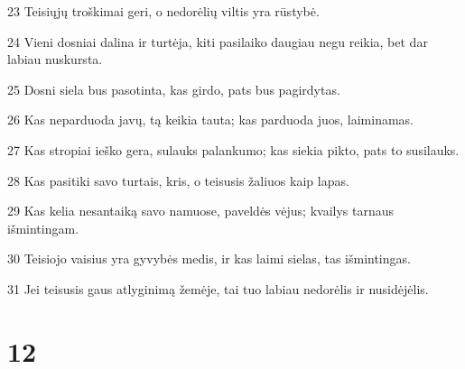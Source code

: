 \par 23 Teisiųjų troškimai geri, o nedorėlių viltis yra rūstybė. 
\par 24 Vieni dosniai dalina ir turtėja, kiti pasilaiko daugiau negu reikia, bet dar labiau nuskursta. 
\par 25 Dosni siela bus pasotinta, kas girdo, pats bus pagirdytas. 
\par 26 Kas neparduoda javų, tą keikia tauta; kas parduoda juos, laiminamas. 
\par 27 Kas stropiai ieško gera, sulauks palankumo; kas siekia pikto, pats to susilauks. 
\par 28 Kas pasitiki savo turtais, kris, o teisusis žaliuos kaip lapas. 
\par 29 Kas kelia nesantaiką savo namuose, paveldės vėjus; kvailys tarnaus išmintingam. 
\par 30 Teisiojo vaisius yra gyvybės medis, ir kas laimi sielas, tas išmintingas. 
\par 31 Jei teisusis gaus atlyginimą žemėje, tai tuo labiau nedorėlis ir nusidėjėlis.



\chapter{12}


